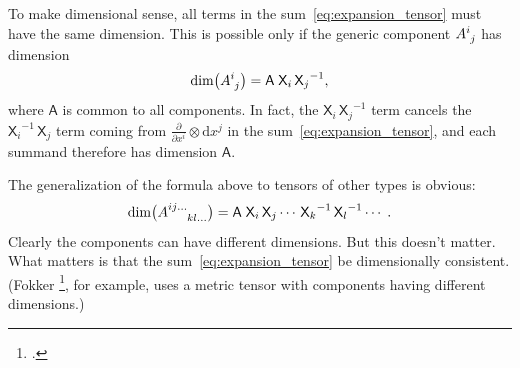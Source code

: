 \documentclass[\ifafour a4paper,12pt,\else a5paper,10pt,\fi%
onecolumn,oneside,article,%
british%
]{memoir}
\theoremstyle{remark}
\theoremstyle{innote}
\newcommand*{\mathte}[1]{\textbf{\textit{\textsf{#1}}}}
\newcommand*{\citep}{\footcites}
\newcommand*{\de}{\partialup}%
\newcommand*{\di}{\mathrm{d}}%
\renewcommand*{\|}[1][]{\nonscript\,#1\vert\nonscript\;\mathopen{}}
\newcommand*{\sect}{\S}%
\newcommand*{\Un}{\textsf{1}}
\newcommand*{\Le}{\textsf{L}}
\newcommand*{\Ti}{\textsf{T}}
\newcommand*{\Ma}{\textsf{M}}
\newcommand*{\Te}{\Theta}
\newcommand*{\Xx}{\textsf{X}}
\newcommand*{\Aa}{\textsf{A}}
\newcommand*{\yA}{\mathte{A}}
\renewcommand*{\i}{\indices}
\newcommand*{\dex}[1][i]{\frac{\de}{\de x^{#1}}}
\newcommand*{\dix}[1][i]{\di x^{#1}}
\begin{document}
\medskip

To make dimensional sense, all terms in the sum~\eqref{eq:expansion_tensor}
must have the same dimension. This is possible only if the generic
component $A\i{^{i}_{j}}$ has dimension
\begin{equation}
  \label{eq:dim_component}
  \dim\bigl(A\i{^{i}_{j}}\bigr) = \Aa\;{\Xx_{i}}\,{\Xx_{j}}^{-1},
\end{equation}
where $\Aa$ is common to all components. In fact, the
${\Xx_{i}}\,{\Xx_{j}}^{-1}$ term cancels the ${\Xx_{i}}^{-1}\,{\Xx_{j}}$
term coming from $\dex\otimes\dix[j]$ in the
sum~\eqref{eq:expansion_tensor}, and each summand therefore has dimension
$\Aa$.

The generalization of the formula above to tensors of other types is obvious:
\begin{equation}
  \label{eq:dim_component_generic}
\dim\bigl(A\i{^{ij\dotso}_{kl\dotso}}\bigr) = \Aa\;{\Xx_{i}}\,{\Xx_{j}}\dotsm\,
  {\Xx_{k}}^{-1}\,{\Xx_{l}}^{-1}\dotsm \;.
\end{equation}
Clearly the components can have different dimensions. But this doesn't matter.
What matters is that the sum~\eqref{eq:expansion_tensor} be dimensionally
consistent. (Fokker \citep[\sect~VII.1 p.~88]{fokker1960_t1965}, for
example, uses a metric tensor with components having different dimensions.)

\medskip
\end{document}
